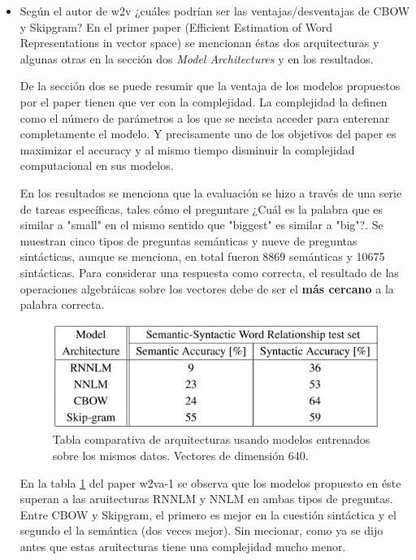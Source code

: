\documentclass[letter, 11pt, twoside]{report}
\begin{document}
\begin{itemize}
  
    \item Según el autor de w2v ¿cuáles podrían ser las ventajas/desventajas de CBOW y Skipgram?
    En el primer paper (Efficient Estimation of Word Representations in vector space) se mencionan éstas dos arquitecturas y algunas otras en la sección dos \textit{Model Architectures} y en los resultados. 
    
    De la sección dos se puede resumir que la ventaja de los modelos propuestos por el paper tienen que ver con la complejidad. La complejidad la definen como el número de parámetros a los que se necista acceder para enterenar completamente el modelo. Y precisamente uno de los objetivos del paper es maximizar el accuracy y al mismo tiempo disminuir la complejidad computacional en sus modelos.

    En los resultados se menciona que la evaluación se hizo a través de una serie de tareas específicas, tales cómo el preguntare ¿Cuál es la palabra que es similar a "small" en el mismo sentido que "biggest" es similar a "big"?. Se muestran cinco tipos de preguntas semánticas y nueve de preguntas sintácticas, aunque se menciona, en total fueron 8869 semánticas y 10675 sintácticas. Para considerar una respuesta como correcta, el resultado de las operaciones algebráicas sobre los vectores debe de ser el \textbf{más cercano}  a la palabra correcta. 

    \begin{figure}[H]
      \begin{center}
        \includegraphics[scale=0.25]{tabla1.jpeg}
        \caption{Tabla comparativa de arquitecturas usando modelos entrenados sobre los mismos datos. Vectores de dimensión 640.}
        \label{models}
      \end{center}
    \end{figure}
    
   En la tabla \ref{models} del paper w2va-1 se observa que los modelos propuesto en éste superan a las aruitecturas RNNLM y NNLM en ambas tipos de preguntas. Entre CBOW y Skipgram, el primero es mejor en la cuestión sintáctica y el segundo el la semántica (dos veces mejor). Sin mecionar, como ya se dijo antes que estas aruitecturas tiene una complejidad mucho menor.


\end{itemize}
\end{document}
